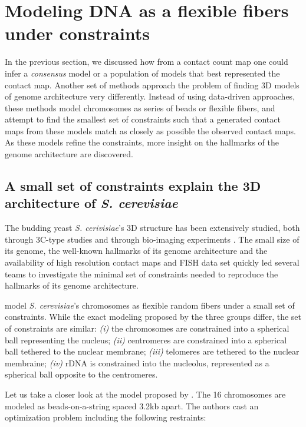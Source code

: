 \documentclass[letterpaper,12pt]{article}
\begin{document}
\section*{Modeling DNA as a flexible fibers under constraints}

In the previous section, we discussed how from a contact count map one could
infer a {\em consensus} model or a population of models that best represented
the contact map. Another set of methods approach the problem of finding 3D
models of genome architecture very differently. Instead of using data-driven
approaches, these methods model chromosomes as series of beads or flexible
fibers, and attempt to find the smallest set of constraints such that a
generated contact maps from these models match as closely as possible the
observed contact maps. As these models refine the constraints, more insight on
the hallmarks of the genome architecture are discovered.


\subsection*{A small set of constraints explain the 3D architecture of \textit{S. cerevisiae}}

The budding yeast \textit{S. cerivisiae}'s 3D structure has been extensively
studied, both through 3C-type studies \citep{dekker:capturing,
duan:three-dimensional, burton:} and through bio-imaging experiments
\citep{XX}. The small size of its genome, the well-known hallmarks of its
genome architecture and the availability of high resolution contact maps and
FISH data set quickly led several teams to investigate the minimal set of
constraints needed to reproduce the hallmarks of its genome architecture.

\cite{tjong:physical, tokuda:dynamical, tjong:physical} model {\em S.
cerevisiae}'s chromosomes as flexible random fibers under a small set of
constraints. While the exact modeling proposed by the three groups differ, the
set of constraints are similar: \textit{(i)} the chromosomes are constrained
into a spherical ball representing the nucleus; \textit{(ii)} centromeres are
constrained into a spherical ball tethered to the nuclear membrane;
\textit{(iii)} telomeres are tethered to the nuclear membraine; \textit{(iv)}
rDNA is constrained into the nucleolus, represented as a spherical ball
opposite to the centromeres.

Let us take a closer look at the model proposed by \citet{tjong:physical}.
The 16 chromosomes are modeled as beads-on-a-string spaced 3.2kb apart. The
authors cast an optimization problem including the following restraints: 
\end{document}
